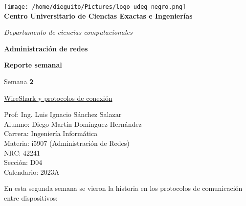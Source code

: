 \documentclass[]{article}
\begin{document}
\begin{titlepage}
\begin{center}
	\texttt{[image: /home/dieguito/Pictures/logo\_udeg\_negro.png]}\\
	\vspace{1cm}
{\Large 	\textbf{Centro Universitario de Ciencias Exactas e Ingenierías}\\}

\vspace{0.5cm}
	
{\large 	\textit{Departamento de ciencias computacionales}\\}
	
	\vspace{1cm}
	
	\textbf{Administración de redes}\\
	
	\vspace{0.5cm}
	
	\textbf{Reporte semanal}\\
	
	\vspace{0.5cm}
	
	Semana \textbf{2}
	
	\vspace{0.5cm}
	
	\underline{WireShark y protocolos de conexión}\\
	
	\vspace{1cm}
	
	Prof: Ing. Luis Ignacio Sánchez Salazar\\
	
	Alumno: Diego Martín Domínguez Hernández\\
	
	Carrera: Ingeniería Informática \\
	
	Materia: i5907 (Administración de Redes)\\
	
	NRC: 42241\\
	
	Sección: D04\\

	Calendario: 2023A\\
	
\end{center}
\end{titlepage}
En esta segunda semana se vieron la
historia en los protocolos de comunicación
entre dispositivos:
\end{document}
